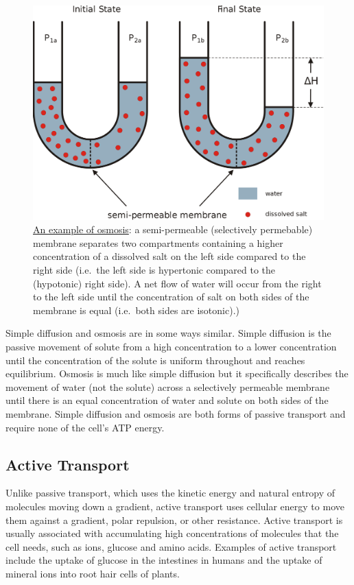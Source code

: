 \begin{figure}

{\centering \includegraphics[width=0.7\linewidth]{./figures/membrane/Osmose_en} 

}

\caption{\href{https://commons.wikimedia.org/wiki/File:Osmose_en.svg}{An example of osmosis}: a semi-permeable (selectively permebable) membrane separates two compartments containing a higher concentration of a dissolved salt on the left side compared to the right side (i.e.~the left side is hypertonic compared to the (hypotonic) right side). A net flow of water will occur from the right to the left side until the concentration of salt on both sides of the membrane is equal (i.e.~both sides are isotonic).)}\label{fig:osmosis}
\end{figure}


Simple diffusion and osmosis are in some ways similar. Simple diffusion is the passive movement of solute from a high concentration to a lower concentration until the concentration of the solute is uniform throughout and reaches equilibrium. Osmosis is much like simple diffusion but it specifically describes the movement of water (not the solute) across a selectively permeable membrane until there is an equal concentration of water and solute on both sides of the membrane. Simple diffusion and osmosis are both forms of passive transport and require none of the cell's ATP energy.

\hypertarget{active-transport}{%
\subsection{Active Transport}\label{active-transport}}

Unlike passive transport, which uses the kinetic energy and natural entropy of molecules moving down a gradient, active transport uses cellular energy to move them against a gradient, polar repulsion, or other resistance. Active transport is usually associated with accumulating high concentrations of molecules that the cell needs, such as ions, glucose and amino acids. Examples of active transport include the uptake of glucose in the intestines in humans and the uptake of mineral ions into root hair cells of plants.

